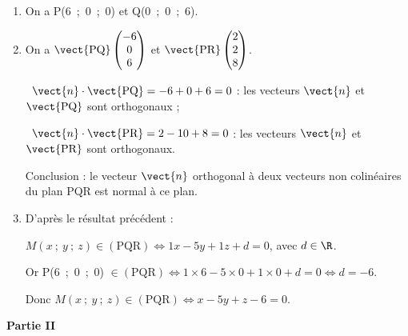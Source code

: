 \begin{enumerate}
\item %

On a P(6~;~0~;~0) et Q(0~;~0~;~6).
\item %
On a $\vect{\text{PQ}}\begin{pmatrix}-6\\0\\6\end{pmatrix}$ et $\vect{\text{PR}}\begin{pmatrix}2\\2\\8\end{pmatrix}$.

\starredbullet~$\vect{n} \cdot \vect{\text{PQ}} = - 6  + 0 + 6 = 0$ : les vecteurs $\vect{n}$ et $\vect{\text{PQ}}$ sont orthogonaux ;


\starredbullet~$\vect{n} \cdot \vect{\text{PR}} = 2 - 10 + 8 = 0$ : les vecteurs $\vect{n}$ et $\vect{\text{PR}}$ sont orthogonaux.

Conclusion : le vecteur $\vect{n}$ orthogonal à deux vecteurs non colinéaires du plan PQR est normal à ce plan.
\item %
D'après le résultat précédent :

$M(x~;~y~;~z) \in (\text{PQR}) \iff 1x - 5y + 1z  + d = 0$, avec $d \in \R$.

Or P(6~;~0~;~0) $ \in (\text{PQR}) \iff 1\times 6  - 5\times 0  + 1\times 0  + d = 0 \iff d = - 6$.

Donc $M(x~;~y~;~z) \in (\text{PQR}) \iff x - 5y + z  - 6 = 0$.
\end{enumerate}

\textbf{Partie II}

\medskip

%

